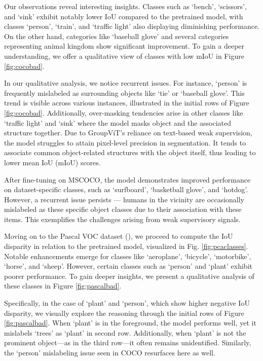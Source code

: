 Our observations reveal interesting insights. Classes such as `bench', `scissors', and `sink' exhibit notably lower IoU compared to the pretrained model, with classes `person', `train', and `traffic light' also displaying diminishing performance. On the other hand, categories like `baseball glove' and several categories representing animal kingdom show significant improvement. To gain a deeper understanding, we offer a qualitative view of classes with low mIoU in Figure \ref{fig:cocobad}.

In our qualitative analysis, we notice recurrent issues. For instance, `person' is frequently mislabeled as surrounding objects like `tie' or `baseball glove'. This trend is visible across various instances, illustrated in the initial rows of Figure \ref{fig:cocobad}. Additionally, over-masking tendencies arise in other classes like `traffic light' and `sink' where the model masks object and the associated structure together. Due to GroupViT's reliance on text-based weak supervision, the model struggles to attain pixel-level precision in segmentation. It tends to associate common object-related structures with the object itself, thus leading to lower mean IoU (mIoU) scores.

After fine-tuning on MSCOCO, the model demonstrates improved performance on dataset-specific classes, such as `surfboard', `basketball glove', and `hotdog'. However, a recurrent issue persists — humans in the vicinity are occasionally mislabeled as these specific object classes due to their association with these items. This exemplifies the challenges arising from weak supervisory signals.
 
  
Moving on to the Pascal VOC dataset (\pvoc), we proceed to compute the IoU disparity in relation to the pretrained model, visualized in Fig. \ref{fig:pcaclasses}. Notable enhancements emerge for classes like `aeroplane', `bicycle', `motorbike', `horse', and `sheep'. However, certain classes such as `person' and `plant' exhibit poorer performance. To gain deeper insights, we present a qualitative analysis of these classes in Figure \ref{fig:pascalbad}.

Specifically, in the case of `plant' and `person', which show higher negative IoU disparity, we visually explore the reasoning through the initial rows of Figure \ref{fig:pascalbad}. When `plant' is in the foreground, the model performs well, yet it mislabels `trees' as `plant' in second row. Additionally, when `plant' is not the prominent object—as in the third row—it often remains unidentified. Similarly, the `person' mislabeling issue seen in COCO resurfaces here as well.

